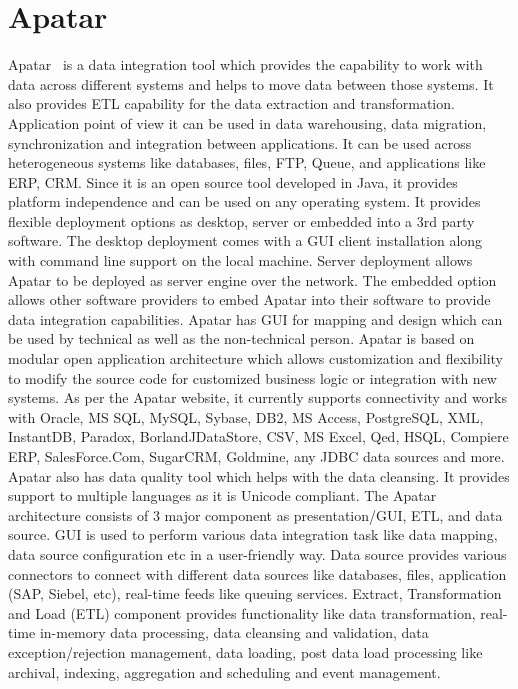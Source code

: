 \section{Apatar}
Apatar~\cite{hid-sp18-402-www-apatar} is a data integration tool which
provides the capability to work with data across different systems and
helps to move data between those systems. It also provides ETL
capability for the data extraction and transformation. Application
point of view it can be used in data warehousing, data migration,
synchronization and integration between applications. It can be used
across heterogeneous systems like databases, files, FTP, Queue, and
applications like ERP, CRM. Since it is an open source tool developed
in Java, it provides platform independence and can be used on any
operating system. It provides flexible deployment options as desktop,
server or embedded into a 3rd party software. The desktop deployment
comes with a GUI client installation along with command line support
on the local machine. Server deployment allows Apatar to be deployed
as server engine over the network. The embedded option allows other
software providers to embed Apatar into their software to provide data
integration capabilities. Apatar has GUI for mapping and design which
can be used by technical as well as the non-technical person. Apatar
is based on modular open application architecture which allows
customization and flexibility to modify the source code for customized
business logic or integration with new systems. As per the Apatar
website, it currently supports connectivity and works with Oracle, MS
SQL, MySQL, Sybase, DB2, MS Access, PostgreSQL, XML, InstantDB,
Paradox, BorlandJDataStore, CSV, MS Excel, Qed, HSQL, Compiere ERP,
SalesForce.Com, SugarCRM, Goldmine, any JDBC data sources and
more. Apatar also has data quality tool which helps with the data
cleansing. It provides support to multiple languages as it is Unicode
compliant. The Apatar architecture consists of 3 major component as
presentation/GUI, ETL, and data source. GUI is used to perform various
data integration task like data mapping, data source configuration etc
in a user-friendly way. Data source provides various connectors to
connect with different data sources like databases, files,
application (SAP, Siebel, etc), real-time feeds like queuing
services. Extract, Transformation and Load (ETL) component provides
functionality like data transformation, real-time in-memory data
processing, data cleansing and validation, data exception/rejection
management, data loading, post data load processing like archival,
indexing, aggregation and scheduling and event management.


